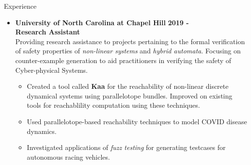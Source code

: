 \documentclass{resume} %
\begin{document}
\begin{rSection}{Experience}
  \begin{itemize}[leftmargin=*]
    \item
      {\bf University of North Carolina at Chapel Hill} \hfill {\bf 2019 -} \\
      {\bf Research Assistant} \\
      Providing research assistance to projects pertaining to the formal verification of safety properties of \emph{non-linear systems} and \emph{hybrid automata}. Focusing on counter-example generation to aid practitioners in verifying the safety of Cyber-physical Systems.
        \begin{itemize}[label=$\blackdiamond$]
            \item Created a tool called {\bf Kaa} for the reachability of non-linear discrete dynamical systems using parallelotope bundles. Improved on existing tools for reachablility computation using these techniques.
            \item Used parallelotope-based reachability techniques to model COVID disease dynamics.
            \item Investigated applications of \emph{fuzz testing} for generating testcases for autonomous racing vehicles.
        \end{itemize}
  \end{itemize}


\end{rSection}

\newpage
\end{document}
